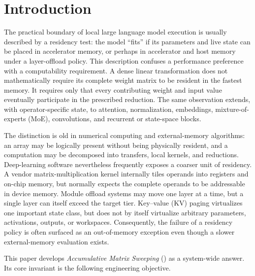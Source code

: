 \section{Introduction}
\label{sec:introduction}

The practical boundary of local large language model execution is usually described by a residency test: the model ``fits'' if its parameters and live state can be placed in accelerator memory, or perhaps in accelerator and host memory under a layer-offload policy. This description confuses a performance preference with a computability requirement. A dense linear transformation does not mathematically require its complete weight matrix to be resident in the fastest memory. It requires only that every contributing weight and input value eventually participate in the prescribed reduction. The same observation extends, with operator-specific state, to attention, normalization, embeddings, mixture-of-experts (MoE), convolutions, and recurrent or state-space blocks.

The distinction is old in numerical computing and external-memory algorithms: an array may be logically present without being physically resident, and a computation may be decomposed into transfers, local kernels, and reductions. Deep-learning software nevertheless frequently exposes a coarser unit of residency. A vendor matrix-multiplication kernel internally tiles operands into registers and on-chip memory, but normally expects the complete operands to be addressable in device memory. Module offload systems may move one layer at a time, but a single layer can itself exceed the target tier. Key--value (KV) paging virtualizes one important state class, but does not by itself virtualize arbitrary parameters, activations, outputs, or workspaces. Consequently, the failure of a residency policy is often surfaced as an out-of-memory exception even though a slower external-memory evaluation exists.

This paper develops \emph{Accumulative Matrix Sweeping} (\AMS) as a system-wide answer. Its core invariant is the following engineering objective.

\begin{center}
\end{center}


